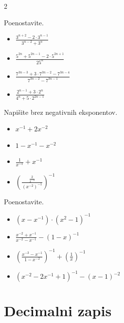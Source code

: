 \begin{multicols}{2}
        
            \begin{naloga}
                Poenostavite.
                \begin{itemize}
                    \item $\frac{3^{n+2}-2\cdot 3^{n-1}}{3^{n-2}+3^n}$ 
                    \item $\frac{5^{2n}+5^{2n-1}-2\cdot 5^{2n+1}}{25^n}$ 
                    \item $\frac{7^{3n-3}+3\cdot 7^{3n-2}-7^{3n-4}}{7^{3n-2}-7^{3n-1}}$ 
                    \item $\frac{2^{n-1}+3\cdot 2^n}{4^n+5\cdot 2^{2n-1}}$ 
                \end{itemize}
            \end{naloga}


            \begin{naloga}
                Napišite brez negativnih eksponentov.
                \begin{itemize}
                    \item $x^{-1}+2x^{-2}$ 
                    \item $1-x^{-1}-x^{-2}$ 
                    \item $\frac{1}{x^{-1}}+x^{-1}$ 
                    \item $\left(\frac{\frac{2}{x^{-2}}}{\left(x^{-2}\right)^{-1}}\right)^{-1}$ 
                \end{itemize}
            \end{naloga}
        

            \begin{naloga}
                Poenostavite.
                \begin{itemize}
                    \item $\left(x-x^{-1}\right)\cdot\left(x^2-1\right)^{-1}$ 
                    \item $\frac{x^{-2}+x^{-1}}{x^{-2}-x^{-1}}-\left(1-x\right)^{-1}$ 
                    \item $\left(\frac{x^{-3}-x^{-1}}{1-x^{-2}}\right)^{-1}+\left(\frac{1}{x}\right)^{-1}$ 
                    \item $\left(x^{-2}-2x^{-1}+1\right)^{-1}-\left(x-1\right)^{-2}$ 
                \end{itemize}
            \end{naloga}
    \end{multicols}

\newpage

\section{Decimalni zapis}

